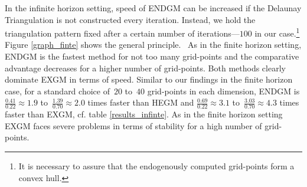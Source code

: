\documentclass[a4paper,12pt]{article}%
\begin{document}
In the infinite horizon setting, speed of ENDGM can be increased if the Delaunay Triangulation is not constructed every iteration. Instead, we hold the triangulation pattern fixed after a certain number of iterations---$100$
in our case.\footnote{It is necessary to assure that the endogenously computed grid-points form a convex hull.} Figure \ref{graph_finte} shows the general principle. \ As in the finite horizon setting, ENDGM is the fastest method for not too many grid-points and the comparative advantage decreases for a higher number of grid-points. Both methods clearly dominate EXGM in terms of speed. Similar to our findings in the finite horizon case, for a standard choice of~$20$ to~$40$ grid-points in each dimension, ENDGM is $\frac{0.41}{0.22}\approx1.9$ to~$\frac{1.39}{0.70}\approx2.0$ times faster than HEGM and $\frac{0.69}{0.22}\approx3.1$ to~$\frac{3.03}{0.70}\approx4.3$ times faster than EXGM, cf. table \ref{results_infinte}. As in the finite horizon setting EXGM faces severe problems in terms of stability for a high number of grid-points.
\end{document}
